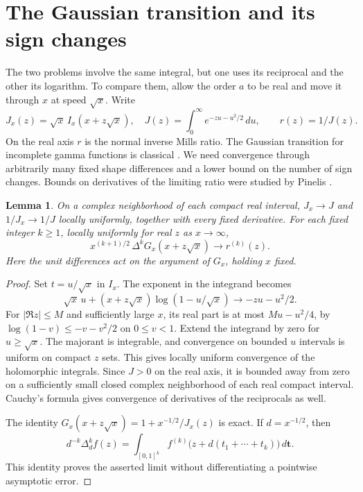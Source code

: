 \documentclass[11pt,a4paper]{article}
\newtheorem{lemma}[theorem]{Lemma}
\begin{document}
\section{The Gaussian transition and its sign changes}
\label{sec:transition}
The two problems involve the same integral, but one uses its reciprocal and the other its logarithm. To compare them, allow the order $a$ to be real and move it through $x$ at speed $\sqrt{x}$. Write
\[
 J_x(z)=\sqrt{x}\,I_x(x+z\sqrt{x}),\quad
 J(z)=\int_0^\infty e^{-zu-u^2/2}\,du,\qquad r(z)=1/J(z).
\]
On the real axis $r$ is the normal inverse Mills ratio. The Gaussian transition for incomplete gamma functions is classical \cite{dlmf}. We need convergence through arbitrarily many fixed shape differences and a lower bound on the number of sign changes. Bounds on derivatives of the limiting ratio were studied by Pinelis \cite{pinelis}.

\begin{lemma}\label{lem:window}
On a complex neighborhood of each compact real interval, $J_x\to J$ and $1/J_x\to 1/J$ locally uniformly, together with every fixed derivative. For each fixed integer $k\ge1$, locally uniformly for real $z$ as $x\to\infty$,
\[
 x^{(k+1)/2}\,\Delta^k G_x(x+z\sqrt{x})\longrightarrow r^{(k)}(z).
\]
Here the unit differences act on the argument of $G_x$, holding $x$ fixed.
\end{lemma}
\begin{proof}
Set $t=u/\sqrt{x}$ in $I_x$. The exponent in the integrand becomes
\[
 \sqrt{x}\,u+(x+z\sqrt{x})\log(1-u/\sqrt{x})
 \longrightarrow -zu-u^2/2.
\]
For $|\Re z|\le M$ and sufficiently large $x$, its real part is at most $Mu-u^2/4$, by $\log(1-v)\le-v-v^2/2$ on $0\le v<1$. Extend the integrand by zero for $u\ge\sqrt{x}$. The majorant is integrable, and convergence on bounded $u$ intervals is uniform on compact $z$ sets. This gives locally uniform convergence of the holomorphic integrals. Since $J>0$ on the real axis, it is bounded away from zero on a sufficiently small closed complex neighborhood of each real compact interval. Cauchy's formula gives convergence of derivatives of the reciprocals as well.

The identity $G_x(x+z\sqrt{x})=1+x^{-1/2}/J_x(z)$ is exact. If $d=x^{-1/2}$, then
\[
 d^{-k}\Delta_d^k f(z)=\int_{[0,1]^k}
 f^{(k)}\bigl(z+d(t_1+\cdots+t_k)\bigr)\,d\boldsymbol t .
\]
This identity proves the asserted limit without differentiating a pointwise asymptotic error.
\end{proof}
\end{document}
